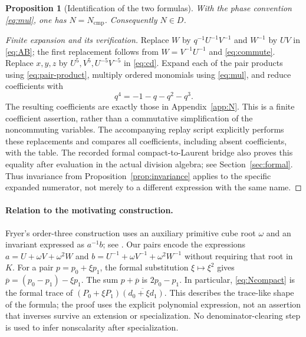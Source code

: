 \documentclass[11pt,letterpaper]{article}
\newtheorem{proposition}[theorem]{Proposition}
\theoremstyle{definition}
\theoremstyle{remark}
\begin{document}
\begin{proposition}[Identification of the two formulas]\label{prop:bridge}
With the phase convention \eqref{eq:mul}, one has $N=N_{\mathrm{cmp}}$.
Consequently $N\in D$.
\end{proposition}
\begin{proof}[Finite expansion and its verification]
Replace $W$ by $q^{-1}U^{-1}V^{-1}$ and $W^{-1}$ by $UV$ in
\eqref{eq:AB}; the first replacement follows from
$W=V^{-1}U^{-1}$ and \eqref{eq:commute}. Replace $x,y,z$ by
$U^5,V^5,U^{-5}V^{-5}$ in \eqref{eq:cd}. Expand each of the pair products
using \eqref{eq:pair-product}, multiply ordered monomials using
\eqref{eq:mul}, and reduce coefficients with
\begin{equation}\label{eq:cyclotomic}
q^4=-1-q-q^2-q^3.
\end{equation}
The resulting coefficients are exactly those in Appendix~\ref{app:N}.
This is a finite coefficient assertion, rather than a commutative
simplification of the noncommuting variables. The accompanying replay
script explicitly performs these replacements and compares all coefficients,
including absent coefficients, with the table. The recorded formal
compact-to-Laurent bridge also proves this equality after evaluation in
the actual division algebra; see Section~\ref{sec:formal}. Thus invariance
from Proposition~\ref{prop:invariance} applies to the specific expanded
numerator, not merely to a different expression with the same name.
\end{proof}

\paragraph{Relation to the motivating construction.}
Fryer's order-three construction uses an auxiliary primitive cube root
$\omega$ and an invariant expressed as $a^{-1}b$; see
\cite[Proposition~3.3 and equations (3.2.1)--(3.2.2)]{Fryer}.
Our pairs encode the expressions
$a=U+\omega V+\omega^2W$ and
$b=U^{-1}+\omega V^{-1}+\omega^2W^{-1}$ without requiring that root in $K$.
For a pair $p=p_0+\xi p_1$, the formal substitution
$\xi\mapsto\xi^2$ gives $\overline p=(p_0-p_1)-\xi p_1$.
The sum $p+\overline p$ is $2p_0-p_1$.
In particular, \eqref{eq:Ncompact} is the formal trace of
$(P_0+\xi P_1)\overline{(d_0+\xi d_1)}$.
This describes the trace-like shape of the formula; the proof uses the
explicit polynomial expression, not an assertion that inverses survive an
extension or specialization. No denominator-clearing step is used to
infer nonscalarity after specialization.
\end{document}
